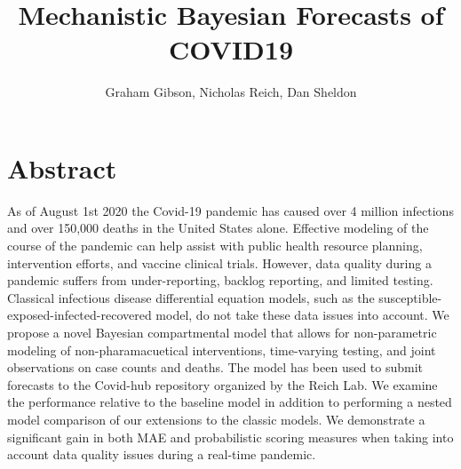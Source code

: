 \documentclass[11pt]{amsart}
\title{Mechanistic Bayesian Forecasts of COVID19}
\author{Graham Gibson, Nicholas Reich, Dan Sheldon}
\begin{document}
\maketitle

\section*{Abstract}

As of August 1st 2020 the Covid-19 pandemic has caused over 4 million infections and over 150,000 deaths in the United States alone. Effective modeling of the course of the pandemic can help assist with public health resource planning, intervention efforts, and vaccine clinical trials. However, data quality during a pandemic suffers from under-reporting, backlog reporting, and limited testing. Classical infectious disease differential equation models, such as the susceptible-exposed-infected-recovered model, do not take these data issues into account. We propose a novel Bayesian compartmental model that allows for non-parametric modeling of non-pharamacuetical interventions, time-varying testing, and joint observations on case counts and deaths. The model has been used to submit forecasts to the Covid-hub repository organized by the Reich Lab. We examine the performance relative to the baseline model in addition to performing a nested model comparison of our extensions to the classic models. We demonstrate a significant gain in both MAE and probabilistic scoring measures when taking into account data quality issues during a real-time pandemic.
\end{document}
